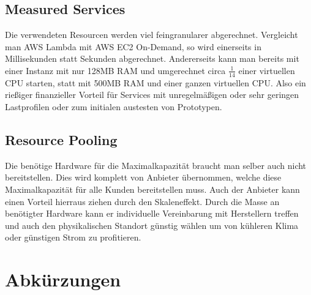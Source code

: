 \documentclass[12pt, a4paper]{article}
\begin{document}
\subsection{Measured Services}
Die verwendeten Resourcen werden viel feingranularer abgerechnet.
Vergleicht man AWS Lambda mit AWS EC2 On-Demand, so wird einerseits in Millisekunden statt Sekunden abgerechnet.
Andererseits kann man bereits mit einer Instanz mit nur 128MB RAM und umgerechnet circa \(\frac{1}{14}\) einer virtuellen CPU starten, statt mit 500MB RAM und einer ganzen virtuellen CPU.
Also ein rießiger finanzieller Vorteil für Services mit unregelmäßigen oder sehr geringen Lastprofilen oder zum initialen austesten von Prototypen.
\newline
\subsection{Resource Pooling}
Die benötige Hardware für die Maximalkapazität braucht man selber auch nicht bereitstellen.
Dies wird komplett von Anbieter übernommen, welche diese Maximalkapazität für alle Kunden bereitstellen muss.
Auch der Anbieter kann einen Vorteil hierraus ziehen durch den Skaleneffekt.
Durch die Masse an benötigter Hardware kann er individuelle Vereinbarung mit Herstellern treffen und auch den physikalischen Standort günstig wählen um von kühleren Klima oder günstigen Strom zu profitieren.






\newpage

\section{Abkürzungen}
\begin{acronym}
\end{acronym}
\newpage



\end{document}

